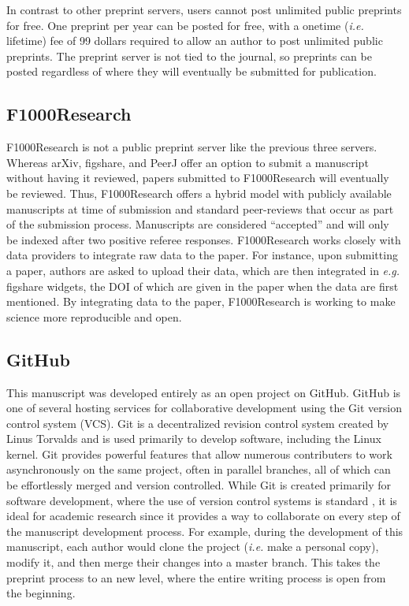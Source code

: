 \documentclass[10pt]{article}
\begin{document}
In contrast to other preprint servers, users cannot post unlimited public
preprints for free. One preprint per year can be posted for free, with a onetime
(\emph{i.e.} lifetime) fee of 99 dollars required to allow an author to post
unlimited public preprints. The preprint server is not tied to the journal, so
preprints can be posted regardless of where they will eventually be submitted
for publication.

\subsection*{F1000Research}\label{f1000r}

F1000Research is not a public preprint server like the previous three servers.
Whereas arXiv, figshare, and PeerJ offer an option to submit a manuscript
without having it reviewed, papers submitted to F1000Research will eventually be
reviewed. Thus, F1000Research offers a hybrid model with publicly available
manuscripts at time of submission and standard peer-reviews that occur as part
of the submission process. Manuscripts are considered ``accepted'' and will only
be indexed after two positive referee responses. F1000Research works closely
with data providers to integrate raw data to the paper. For instance, upon
submitting a paper, authors are asked to upload their data, which are then
integrated in \emph{e.g.} figshare widgets, the DOI of which are given in the
paper when the data are first mentioned.  By integrating data to the paper,
F1000Research is working to make science more reproducible and open.

\subsection*{GitHub}

This manuscript was developed entirely as an open project on GitHub. GitHub is
one of several hosting services for collaborative development using the Git
version control system (VCS).  Git is a decentralized revision control system
created by Linus Torvalds and is used primarily to develop software, including
the Linux kernel. Git provides powerful features that allow numerous
contributers to work asynchronously on the same project, often in parallel
branches, all of which can be effortlessly merged and version controlled.  While
Git is created primarily for software development, where the use of version
control systems is standard \cite{aru12}, it is ideal for academic research
since it provides a way to collaborate on every step of the manuscript
development process. For example, during the development of this manuscript,
each author would clone the project (\emph{i.e.} make a personal copy), modify
it, and then merge their changes into a master branch. This takes the preprint
process to an new level, where the entire writing process is open from the
beginning.
\end{document}
